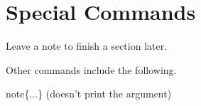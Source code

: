 \section{Special Commands}
Leave a note to finish a section later.
\notfinished{}

Other commands include the following.
\begin{bulletedlist}
	\item {}
	\item {}
	\item {} \tbs{}note\{...\} (doesn't print the argument)
\end{bulletedlist} 
